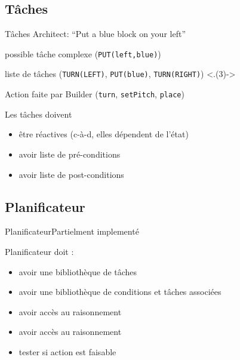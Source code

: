 \documentclass[aspectratio=169]{audition-beamer}
\begin{document}
\subsection{Tâches}
\begin{frame}{Tâches}
  \vfill
  \pause
  Architect: ``Put a blue block on your left''

  \vfill
  \begin{description}[<+(1)->]
    \item[Filtered Task] possible tâche complexe (\texttt{PUT(left,blue)})
    \item[Task] liste de tâches (\texttt{TURN(LEFT)}, \texttt{PUT(blue)}, \texttt{TURN(RIGHT)}) \only<.(3)->{\alert{\textleftarrow} }
    \item[Commands] Action faite par Builder (\texttt{turn}, \texttt{setPitch}, \texttt{place})
  \end{description}

  \vfill
  \pause
  Les tâches doivent
  \begin{itemize}[<+(1)->]
    \item être réactives (c-à-d, elles dépendent de l'état)
    \item avoir liste de pré-conditions
    \item avoir liste de post-conditions
  \end{itemize}

\end{frame}

\subsection{Planificateur}
\begin{frame}{Planificateur}{Partielment implementé }

  \pause
  Planificateur doit :
  \begin{itemize}[<+(1)->]
    \item[\only<8->{\checkmark}] avoir une bibliothèque de tâches
    \item[] avoir une bibliothèque de conditions et tâches associées
    \item[\only<8->{\checkmark}] avoir accès au raisonnement
    \item[] avoir accès au raisonnement
    \item[] tester si action est faisable
  \end{itemize}
\end{frame}
\end{document}
